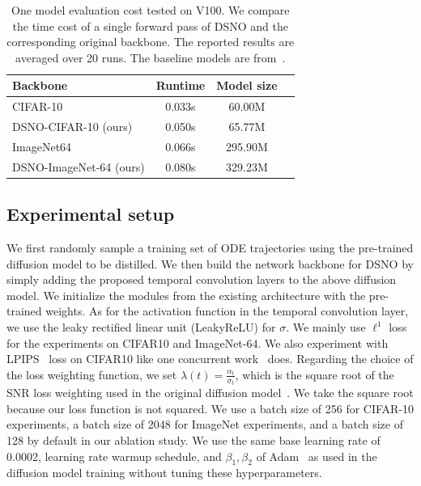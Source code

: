 \begin{table}[t]
\caption{One model evaluation cost tested on V100. We compare the time cost of a single forward pass of DSNO and the corresponding original backbone. The reported results are averaged over 20 runs. The baseline models are from~\citet{salimans2021progressive}.}
\label{tb:speed_cifar}
\begin{center}
\begin{small}
\begin{tabular}{lccc}
\toprule
Backbone & Runtime & Model size \\
\midrule
CIFAR-10   & 0.033s & 60.00M \\
 DSNO-CIFAR-10 (ours)   & 0.050s & 65.77M\\
 \midrule
ImageNet64   & 0.066s & 295.90M  \\
DSNO-ImageNet-64 (ours) & 0.080s &  329.23M\\
\bottomrule
\end{tabular}
\end{small}
\end{center}
\vskip -0.1in
\end{table}


\subsection{Experimental setup}
We first randomly sample a training set of ODE trajectories using the pre-trained diffusion model to be distilled. 
We then build the network backbone for DSNO by simply adding the proposed temporal convolution layers to the above diffusion model. We initialize the modules from the existing architecture  with the pre-trained weights. 
As for the activation function in the temporal convolution layer, we use the leaky rectified linear unit (LeakyReLU) for $\sigma$.
We mainly use $\ell^1$ loss for the experiments on CIFAR10 and ImageNet-64. We also experiment with LPIPS~\cite{zhang2018unreasonable} loss on CIFAR10 like one concurrent work~\cite{song2023consistency} does. Regarding the choice of the loss weighting function, we set $\lambda(t) = \frac{\alpha_t}{\sigma_t}$, which is the square root of the SNR loss weighting used in the original diffusion model~\cite{salimans2021progressive}. We take the square root because our loss function is not squared. 
We use a batch size of 256 for CIFAR-10 experiments, a batch size of 2048 for ImageNet experiments, and a batch size of 128 by default in our ablation study. We use the same base learning rate of 0.0002, learning rate warmup schedule, and $\beta_1,\beta_2$ of Adam~\cite{kingma2014adam} as used in the diffusion model training without tuning these hyperparameters. 
\vspace{-0.1in}
